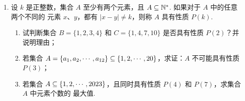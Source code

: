 \documentclass[a4paper,11pt]{article}
\begin{document}
\begin{enumerate}
\fi

\ansspace[8]

\item 设 $k$ 是正整数，集合 $A$ 至少有两个元素，且 $A\subseteq\mathbb{N}^*$. 如果对于 $A$ 中的任意两个不同的
元素 $x$、$y$，都有 $|x-y|\neq k$，则称 $A$ 具有性质 $P(k)$.

\begin{enumerate}[label=(\arabic*)]

\item 试判断集合 $B=\{1,2,3,4\}$ 和 $C=\{1,4,7,10\}$ 是否具有性质 $P(2)$？并说明理由；

\item 若集合 $A=\{a_1,a_2,\cdots,a_{12}\}\subseteq\{1,2,\cdots,20\}$，求证：$A$ 不可能具有性质 $P(3)$；

\item 若集合 $A\subseteq\{1,2,\cdots,2023\}$，且同时具有性质 $P(4)$ 和 $P(7)$，求集合 $A$ 中元素个数的
最大值.

\end{enumerate}



\end{enumerate}
\end{document}
